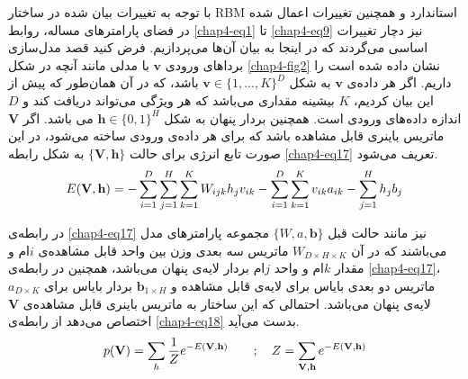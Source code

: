 با توجه به تغییرات بیان شده در ساختار
RBM
استاندارد و همچنین تغییرات اعمال شده در فضای پارامتر‌های مساله، روابط
\ref{chap4-eq1}
تا
\ref{chap4-eq9}
نیز دچار تغییرات اساسی‌ می‌‌گردند که در اینجا به بیان آن‌ها می‌پردازیم. فرض کنید قصد مدل‌سازی بردا‌های ورودی
$\textbf{v}$
با مدلی‌ مانند آنچه در شکل
\ref{chap4-fig2}
نشان داده شده است را داریم. اگر هر داده‌ی
$\textbf{v}$
به شکل
$\textbf{v} \in \{1, ..., K\}^D$
باشد، که در آن همان‌طور که پیش از این بیان کردیم،
$K$
بیشینه مقداری می‌‌باشد که هر ویژگی‌ می‌‌تواند دریافت کند و
$D$
اندازه داده‌های ورودی است. همچنین بردار پنهان به شکل
$\textbf{h} \in \{0,1\}^H$
می‌ باشد. اگر
$\textbf{V}$
ماتریس باینری قابل مشاهده باشد که برای هر داده‌ی ورودی ساخته می‌‌شود، در این صورت تابع انرژی برای حالت
$\{\textbf{V},\textbf{h}\}$
به شکل رابطه
\ref{chap4-eq17}
تعریف می‌‌شود.
\begin{align}
	\centering
	\label{chap4-eq17}
	E(\textbf{V},\textbf{h})=-\sum_{i=1}^{D}\sum_{j=1}^{H}\sum_{k=1}^{K}W_{ijk}h_jv_{ik}-\sum_{i=1}^{D}\sum_{k=1}^{K}v_{ik}a_{ik} - \sum_{j=1}^{H}h_jb_j
\end{align}

در رابطه‌ی‌
\ref{chap4-eq17}
نیز مانند حالت قبل
$\{W, a, \textbf{b}\}$
مجموعه پارامتر‌های مدل می‌‌باشند که در آن
$W_{D \times H \times K}$
ماتریس سه‌ بعدی وزن بین واحد قابل مشاهده‌ی
$i$ام
 و مقدار
$k$ام
 و واحد
$j$ام 
بردار لایه‌ی پنهان می‌‌باشد، همچنین در رابطه‌ی
\ref{chap4-eq17}، $a_{D \times K}$
ماتریس دو بعدی بایاس برای لایه‌ی قابل مشاهده و
$\textbf{b}_{1 \times H}$
بردار بایاس برای لایه‌ی پنهان می‌‌باشد. احتمالی‌ که این ساختار به ماتریس باینری قابل مشاهده‌ی
$\textbf{V}$
اختصاص می‌‌دهد از رابطه‌ی
\ref{chap4-eq18}
 بدست می‌‌آید.
 \begin{align}
 	\centering
 	\label{chap4-eq18}
 	p(\textbf{V}) = \sum_{h} \dfrac{1}{Z} e^{-E(\textbf{V},\textbf{h})} \quad\quad ; \quad
 	Z = \sum_{\textbf{V},\textbf{h}} e^{-E(\textbf{V},\textbf{h})} 
 \end{align}

